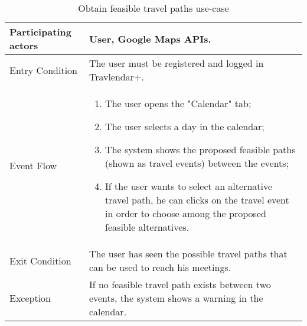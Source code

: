 \begin{table}[H]
	\begin{center}
		\begin{tabular}{ | p{} | p{} | }
		\hline
		Participating actors & User, Google Maps APIs.\\
		\hline
		Entry Condition & The user must be registered and logged in Travlendar+.\\
		\hline
		Event Flow & 
			\begin{enumerate}
				\item The user opens the "Calendar" tab;
				\item The user selects a day in the calendar;
				\item The system shows the proposed feasible paths (shown as travel events) between the events;
				\item If the user wants to select an alternative travel path, he can clicks on the travel event in order to choose among the proposed feasible alternatives.
			\end{enumerate} \\
		\hline
		Exit Condition & The user has seen the possible travel paths that can be used to reach his meetings.\\
		\hline
		Exception & If no feasible travel path exists between two events, the system shows a warning in the calendar.\\ 
		\hline
		\end{tabular}
	\end{center}
	\caption{Obtain feasible travel paths use-case}
\end{table}